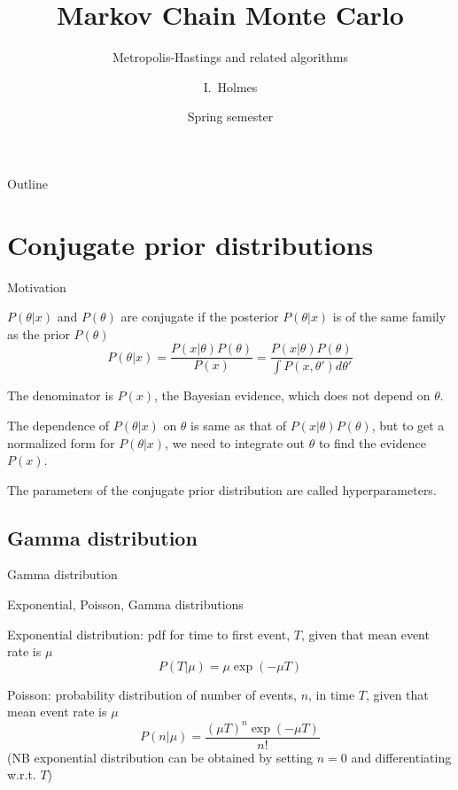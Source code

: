 \documentclass{beamer}
\title[MCMC] %
{Markov Chain Monte Carlo}
\subtitle
{Metropolis-Hastings and related algorithms} %
\author%
{I.~Holmes} %
\institute[University of California, Berkeley] %
{
  Department of Bioengineering\\
  University of California, Berkeley}
\date%
{Spring semester}
\begin{document}
\begin{frame}
  \titlepage
\end{frame}

\begin{frame}{Outline}
  \tableofcontents
\end{frame}

\section{Conjugate prior distributions}

\begin{frame}{Motivation}

\itemb
\item $P(\theta|x)$ and $P(\theta)$ are \alert{conjugate} if the posterior $P(\theta|x)$ is of the same family as the prior $P(\theta)$
\[
P(\theta|x) = \frac{P(x|\theta) P(\theta)}{P(x)} = \frac{P(x|\theta) P(\theta)}{\int P(x,\theta') d\theta'}
\]
\item The denominator is $P(x)$, the \alert{Bayesian evidence}, which does not depend on $\theta$.
\item The dependence of $P(\theta|x)$ on $\theta$ is same as that of $P(x|\theta)P(\theta)$,
but to get a normalized form for $P(\theta|x)$, we need to integrate out $\theta$ to find the evidence $P(x)$.
\item The parameters of the conjugate prior distribution are called \alert{hyperparameters}.
\iteme

\end{frame}

\subsection{Gamma distribution}

\begin{frame}{Gamma distribution}

\itemb
\item Exponential, Poisson, Gamma distributions
 \itemb
 \item Exponential distribution: pdf for time to first event, $T$, given that mean event rate is $\mu$
\[
P(T|\mu) = \mu \exp(-\mu T)
\]
 \item Poisson: probability distribution of number of events, $n$, in time $T$, given that mean event rate is $\mu$
\[
P(n|\mu) = \frac{(\mu T)^n \exp(-\mu T)}{n!}
\]
(NB exponential distribution can be obtained by setting $n=0$ and differentiating w.r.t. $T$)
\iteme
\iteme


\end{frame}
\end{document}

